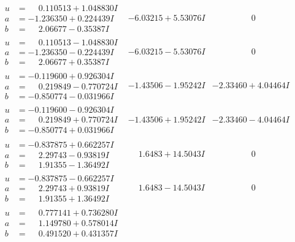 \documentclass[1p]{elsarticle_modified}
\theoremstyle{definition}
\begin{document}
$$\begin{array}{c|c|c}
\begin{aligned}
u &= \phantom{-}0.110513 + 1.048830 I \\
a &= -1.236350 + 0.224439 I \\
b &= \phantom{-}2.06677 - 0.35387 I\end{aligned}
 & -6.03215 + 5.53076 I & \phantom{-0.000000 } 0 \\ \hline\begin{aligned}
u &= \phantom{-}0.110513 - 1.048830 I \\
a &= -1.236350 - 0.224439 I \\
b &= \phantom{-}2.06677 + 0.35387 I\end{aligned}
 & -6.03215 - 5.53076 I & \phantom{-0.000000 } 0 \\ \hline\begin{aligned}
u &= -0.119600 + 0.926304 I \\
a &= \phantom{-}0.219849 - 0.770724 I \\
b &= -0.850774 - 0.031966 I\end{aligned}
 & -1.43506 - 1.95242 I & -2.33460 + 4.04464 I \\ \hline\begin{aligned}
u &= -0.119600 - 0.926304 I \\
a &= \phantom{-}0.219849 + 0.770724 I \\
b &= -0.850774 + 0.031966 I\end{aligned}
 & -1.43506 + 1.95242 I & -2.33460 - 4.04464 I \\ \hline\begin{aligned}
u &= -0.837875 + 0.662257 I \\
a &= \phantom{-}2.29743 - 0.93819 I \\
b &= \phantom{-}1.91355 - 1.36492 I\end{aligned}
 & \phantom{-}1.6483 + 14.5043 I & \phantom{-0.000000 } 0 \\ \hline\begin{aligned}
u &= -0.837875 - 0.662257 I \\
a &= \phantom{-}2.29743 + 0.93819 I \\
b &= \phantom{-}1.91355 + 1.36492 I\end{aligned}
 & \phantom{-}1.6483 - 14.5043 I & \phantom{-0.000000 } 0 \\ \hline\begin{aligned}
u &= \phantom{-}0.777141 + 0.736280 I \\
a &= \phantom{-}1.149780 + 0.578014 I \\
b &= \phantom{-}0.491520 + 0.431357 I\end{aligned}

\end{array}$$
\end{document}

